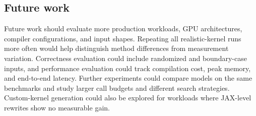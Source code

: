 \documentclass[conference]{IEEEtran}
\begin{document}
\subsection{Future work}
Future work should evaluate more production workloads, GPU architectures,
compiler configurations, and input shapes. Repeating all realistic-kernel
runs more often would help distinguish method differences from measurement
variation. Correctness evaluation could include randomized and boundary-case
inputs, and performance evaluation could track compilation cost, peak memory,
and end-to-end latency. Further experiments could compare models on the same
benchmarks and study larger call budgets and different search strategies.
Custom-kernel generation could also be explored for workloads where JAX-level
rewrites show no measurable gain.







\end{document}
